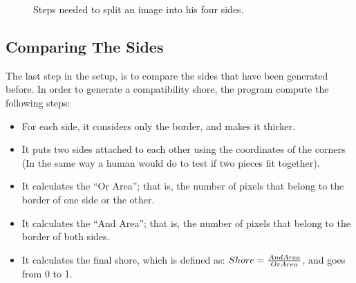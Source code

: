 \documentclass{article}
\begin{document}
\begin{figure}
  \caption{Steps needed to split an image into his four sides.}
  \label{fig:splitting_sides}
  
\end{figure}

\subsection{Comparing The Sides}\label{document:my_comparator}
The last step in the setup, is to compare the sides that have been
generated before.
In order to generate a compatibility shore,
the program compute the following steps:

\begin{itemize}
  \item For each side, it considers only the border, and  makes it thicker.
  \item It puts two sides attached to each other using the coordinates of the corners (In the same way a human would do to test if two pieces fit together).
  \item It calculates the “Or Area”; that is, the number of pixels that belong to the border of one side or the other.
  \item It calculates the “And Area”; that is, the number of pixels that belong to the border of both sides.
  \item It calculates the final shore, which is defined as: \(Shore = \frac{And \space Area}{Or \space Area}\), and goes from 0 to 1.
\end{itemize}
\end{document}
